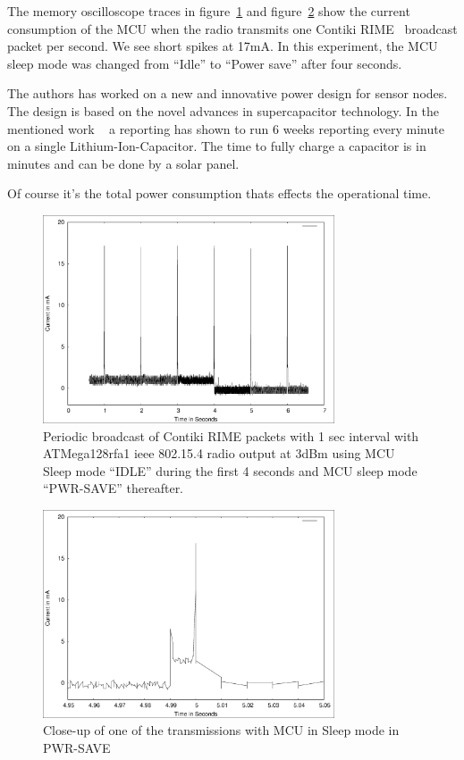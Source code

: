 \documentclass[conference, a4paper,10pt,twocolumn]{IEEEtran}
\begin{document}
The memory oscilloscope traces in figure~\ref{fig:bcast} 
and figure~\ref{fig:bcast-detail} show the current consumption 
of the MCU when the radio transmits one Contiki RIME~\cite{RIME} 
broadcast packet per second. 
We see short spikes at 17mA. In this experiment, the MCU sleep 
mode was changed from ``Idle'' to ``Power save'' after four seconds.

The authors has worked on a new and innovative power design 
for sensor nodes. The design is based on the novel advances 
in supercapacitor technology. In the mentioned work ~\cite{LICCAP}  
a reporting has shown to run 6 weeks reporting every minute
on a single Lithium-Ion-Capacitor. The time to fully charge 
a capacitor is in minutes and can be done by a solar panel.

Of course it's the total power consumption thats effects 
the operational time. 

\begin{figure}
\centering
    \includegraphics[width=3.4in]{bcast.eps}
    \caption{Periodic broadcast of Contiki RIME packets with 1 sec interval with ATMega128rfa1 ieee 802.15.4 radio output at 3dBm using MCU Sleep mode “IDLE” during the first 4 seconds and MCU sleep mode “PWR-SAVE” thereafter.}
    \label{fig:bcast}
\end{figure}


\begin{figure}
\centering
    \includegraphics[width=3.4in]{bcast-detail.eps}
    \caption{Close-up of one of the transmissions with MCU in Sleep mode in PWR-SAVE}
    \label{fig:bcast-detail}
\end{figure}
\end{document}
